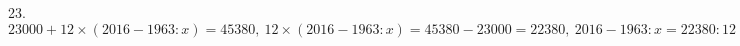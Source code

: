 23. $23000+12\times (2016-1963:x)=45380,\ 12\times (2016-1963:x)=45380-23000=22380,\ 2016-1963:x=22380:12=1865,\ 1963:x=2016-1865=151,\ x=1963:151=13.$\\
